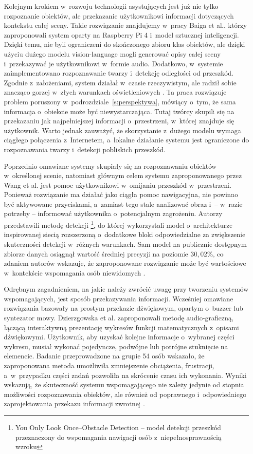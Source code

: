 Kolejnym krokiem w~rozwoju technologii asystujących jest już nie tylko rozpoznanie obiektów, ale przekazanie użytkownikowi informacji dotyczących kontekstu całej sceny. Takie rozwiązanie znajdujemy w~pracy Baiga et al., którzy zaproponowali system oparty na Raspberry Pi 4 i~model sztucznej inteligencji. Dzięki temu, nie byli ograniczeni do skończonego zbioru klas obiektów, ale dzięki użyciu dużego modelu vision-language mogli generować opisy całej sceny i~przekazywać je użytkownikowi w~formie audio. Dodatkowo, w~systemie zaimplementowano rozpoznawanie twarzy i~detekcję odległości od przeszkód. Zgodnie z~założeniami, system działał w~czasie rzeczywistym, ale radził sobie znacząco gorzej w~złych warunkach oświetleniowych \cite{bib:wearablevisionassistance}. Ta praca rozwiązuje problem poruszony w~podrozdziale~\ref{s:perspektywa}, mówiący o~tym, że sama informacja o~obiekcie może być niewystarczająca. Tutaj twórcy skupili się na przekazaniu jak najpełniejszej informacji o~przestrzeni, w~której znajduje się użytkownik. Warto jednak zauważyć, że skorzystanie z~dużego modelu wymaga ciągłego połączenia z~Internetem, a~lokalne działanie systemu jest ograniczone do rozpoznawania twarzy i~detekcji pobliskich przeszkód.

Poprzednio omawiane systemy skupiały się na rozpoznawaniu obiektów w~określonej scenie, natomiast głównym celem systemu zaproponowanego przez Wang et al. jest pomoc użytkownikowi w~omijaniu przeszkód w~przestrzeni. Ponieważ rozwiązanie ma działać jako ciągła pomoc nawigacyjna, nie powinno być aktywowane przyciskami, a~zamiast tego stale analizować obraz i~-- w~razie potrzeby -- informować użytkownika o~potencjalnym zagrożeniu. Autorzy przedstawili metodę detekcji \footnote{You Only Look Once--Obstacle Detection -- model detekcji przeszkód przeznaczony do wspomagania nawigacji osób z~niepełnosprawnością wzroku}, do której wykorzystali model o~architekturze inspirowanej siecią  rozszerzoną o~dodatkowe bloki odpowiedzialne za zwiększenie skuteczności detekcji w~różnych warunkach. Sam model na publicznie dostępnym zbiorze danych osiągnął wartość średniej precyzji na poziomie $30,02\%$, co zdaniem autorów wskazuje, że zaproponowane rozwiązanie może być wartościowe w~kontekście wspomagania osób niewidomych \cite{bib:yolo_od}.

Odrębnym zagadnieniem, na jakie należy zwrócić uwagę przy tworzeniu systemów wspomagających, jest sposób przekazywania informacji. Wcześniej omawiane rozwiązania bazowały na prostym przekazie dźwiękowym, opartym o~buzzer lub syntezator mowy. Dzierzgowska et al. zaproponowali metodę audio-graficzną, łączącą interaktywną prezentację wykresów funkcji matematycznych z~opisami dźwiękowymi. Użytkownik, aby uzyskać kolejne informacje o~wybranej części wykresu, musiał wykonać pojedyncze, podwójne lub potrójne stuknięcie na elemencie. Badanie przeprowadzone na grupie 54 osób wskazało, że zaproponowana metoda umożliwiła zmniejszenie obciążenia, frustracji, a~w~przypadku części zadań pozwoliła na skrócenie czasu ich wykonania. Wyniki wskazują, że skuteczność systemu wspomagającego nie zależy jedynie od stopnia możliwości rozpoznawania obiektów, ale również od poprawnego i~odpowiedniego zaprojektowania przekazu informacji zwrotnej \cite{bib:Dzierzgowska2025}.

